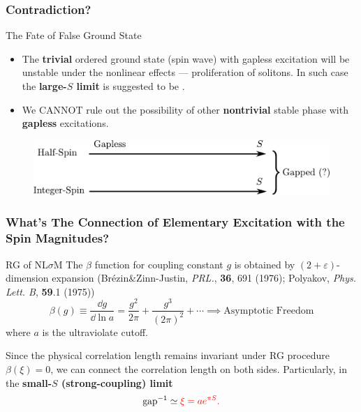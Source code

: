 \documentclass[10pt,aspectratio=43,xcolor=x11names,t]{beamer}%
\begin{document}
		\begin{frame}\frametitle{Contradiction?}
			\begin{block}{The Fate of False Ground State}
				\begin{itemize}
					\item The \textbf{trivial} ordered ground state (spin wave) with gapless excitation will be unstable under the nonlinear effects --- proliferation of solitons. In such case the \textbf{large-$S$ limit} is suggested to be \textbf{\color{red}{gapped}}.
					\item We CANNOT rule out the possibility of other \textbf{nontrivial} stable phase with \textbf{\color{red}gapless} excitations.
				\end{itemize}
			\end{block}
			\vspace{1em}
			\begin{figure}[!htp]
				\centering
				\includegraphics[scale=0.6]{RG.pdf}
			\end{figure}
		\end{frame}
		
		\begin{frame}\frametitle{What's The Connection of Elementary Excitation with the Spin Magnitudes?}
			\begin{block}{RG of NL$\sigma$M}
				The $\beta$ function for coupling constant $g$ is obtained by $(2+\varepsilon)$-dimension expansion ({\scriptsize Brézin\&Zinn-Justin, \textit{PRL.}, \textbf{36}, 691 (1976); Polyakov, \textit{Phys. Lett. B}, \textbf{59}.1 (1975)})
				\begin{equation*}
					\beta(g)\equiv\dfrac{\dd g}{\dd\ln a}=\dfrac{g^2}{2\pi}+\dfrac{g^3}{(2\pi)^2}+\cdots\implies\text{Asymptotic Freedom}
				\end{equation*}
				where $a$ is the ultraviolate cutoff. 
			\end{block}
			Since the physical correlation length remains invariant under RG procedure $\beta(\xi)=0$, we can connect the correlation length on both sides. Particularly, in the \textbf{small-$S$ (strong-coupling) limit}
			\begin{equation*}
				\text{gap}^{-1}\simeq\color{red}\xi= ae^{\pi S}.
			\end{equation*}
		\end{frame}
		
\end{document}
